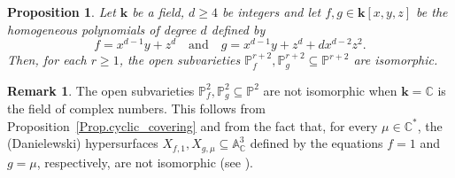 \documentclass[11pt]{article}
\newcommand\quand{\quad\text{and}\quad}
\newtheorem{proposition}[lemma]{Proposition}
\theoremstyle{definition}
\newtheorem{remark}[lemma]{Remark}
\newcommand\A{{\mathbb A}}\let\AA\A
\newcommand\C{{\mathbb C}}\let\CC\C
\renewcommand\k{{\mathbf k}}
\newcommand\p{{\mathbb P}}\let\PP\p
\newcommand{\kk}{\mathbf{k}}
\begin{document}
\begin{proposition}\label{Prop.Counterexample.dim3}Let $\kk$ be a field, $d\ge 4$ be integers and let $f,g\in\k[x,y,z]$ be the homogeneous polynomials of degree $d$ defined by \[f=x^{d-1}y+z^{d} \quand g=x^{d-1}y+z^{d}+dx^{d-2}z^2.\] Then, for each $r\ge 1$, the
open subvarieties $\p^{r+2}_f,\p^{r+2}_g \subseteq \p^{r+2}$ are isomorphic.
\end{proposition}

\begin{remark}
The open subvarieties $\p^{2}_f,\p^{2}_g \subseteq \p^{2}$ are not isomorphic when $\kk=\mathbb{C}$ is the field of complex numbers. This follows from Proposition~\ref{Prop.cyclic_covering} and from the fact that, for every $\mu\in\C^*$, the (Danielewski) hypersurfaces $X_{f,1}, X_{g,\mu}\subseteq\A^3_{\mathbb{C}}$ defined by the equations $f=1$ and $g=\mu$, respectively, are not isomorphic (see \cite[Th.\,9]{PoloniClassifications}).
\end{remark}
\end{document}
